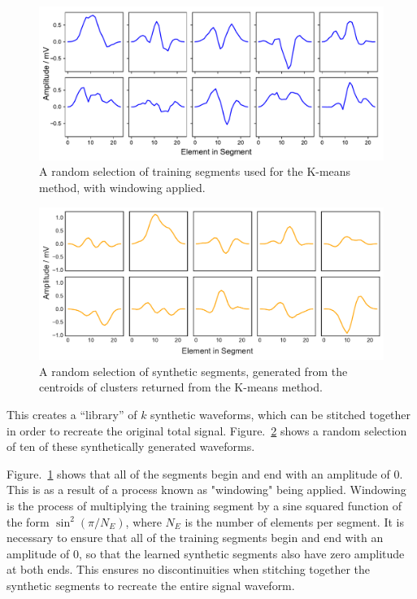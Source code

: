 \begin{figure}[t]
    \includegraphics[width=1.0\textwidth]{fig/kmeans_training.pdf}
    \caption[K-means training segments]{A random selection of training segments used for the K-means method, with windowing applied.}
    \label{fig:kmeans_training}
\end{figure}

\begin{figure}[t]
    \includegraphics[width=1.0\textwidth]{fig/kmeans_synthetic.pdf}
    \caption[K-means synthetic segments]{A random selection of synthetic segments, generated from the centroids of clusters returned from the K-means method.}
    \label{fig:kmeans_synthetic}
\end{figure}

This creates a ``library'' of $k$ synthetic waveforms, which can be stitched together in order to recreate the original total signal. Figure.~\ref{fig:kmeans_synthetic} shows a random selection of ten of these synthetically generated waveforms.

Figure.~\ref{fig:kmeans_training} shows that all of the segments begin and end with an amplitude of $0$. This is as a result of a process known as "windowing" being applied. Windowing is the process of multiplying the training segment by a sine squared function of the form $\sin^2(\pi/N_E)$, where $N_E$ is the number of elements per segment. It is necessary to ensure that all of the training segments begin and end with an amplitude of $0$, so that the learned synthetic segments also have zero amplitude at both ends. This ensures no discontinuities when stitching together the synthetic segments to recreate the entire signal waveform. 

